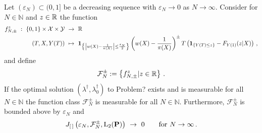 \begin{lemma}
  \label{bounded_f_lemma}
  Let 
  $(\varepsilon_N)\subset(0,1]$ be a decreasing sequence with 
  $\varepsilon_N\to 0$ as $N\to\infty$.
  Consider for
  $N\in\mathbb{N}$ and $z\in\mathbb{R}$ the function
 \begin{align*}
    f_{N,\pm}^z
    \ 
    :
    \ 
      \left\{ 0,1 \right\}
      \times
      \mathcal{X}
      \times
      \mathcal{Y}
    &
    \ 
    \to
    \ 
    \R
    \\
      (T,X,Y(T))
    &
      \ 
      \mapsto
      \ 
      \mathbf{1}
      _
      {\left\{ 
          \left|
      w(X)-\frac{1}{\pi(X)}
          \right|
          \le
          \frac{\varepsilon_N}{2}
      \right\}}
      \left( 
      w(X)-\frac{1}{\pi(X)}
      \right)
      ^{\pm}
      T
      \left( 
        \mathbf{1}
        _{\left\{ Y(T)\le z \right\}}
        -
        F_{Y(1)}(z|X)
      \right)
      \,,
  \end{align*}
  and define 
  \begin{gather*}
    \mathcal{F}_N^\pm
    :=
    \left\{ 
    f_{N,\pm}^z
    |
    z\in\mathbb{R}
    \right\}
    \,.
  \end{gather*}
  If the optimal solution $(\lambda^\dagger,\lambda_0^\dagger)$ to Problem? exists and is measurable for all $N\in\mathbb{N}$ 
  the function class
  $
    \mathcal{F}_N^\pm
  $
    is measurable for all $N\in\mathbb{N}$.
    Furthermore, $\mathcal{F}_N^\pm$ is bounded above by $\varepsilon_N$ and
    \begin{gather*}
     J_{[\, ]}
    \left( 
      \varepsilon_N
    ,
    \mathcal{F}_N^\pm
    ,
    \mathrm{L}_2(\P)
    \right)
    \ 
    \to
    \ 
    0
    \qquad
    \text{for}
    \ 
    N
    \to
    \infty
\,. 
    \end{gather*}
\end{lemma}

